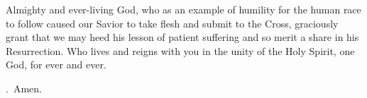\lettrine[lines=3]{A}{}lmighty and ever-living God,
who as an example of humility for the human race to follow
caused our Savior to take flesh and submit to the Cross,
graciously grant that we may heed his lesson of patient suffering
and so merit a share in his Resurrection.
Who lives and reigns with you in the unity of the Holy Spirit,
one God, for ever and ever. \par \Rbar.~Amen.

